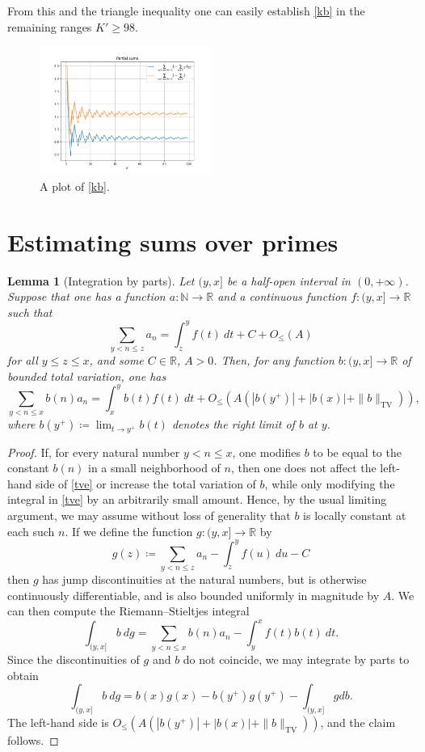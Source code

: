 \documentclass[12pt,a4paper,reqno]{amsart}
\numberwithin{equation}{section}
\theoremstyle{plain}
\newtheorem{lemma}[theorem]{Lemma}
\theoremstyle{definition}
\newcommand\R{\mathbb{R}}
\newcommand\N{\mathbb{N}}
\begin{document}
    From this and the triangle inequality one can easily establish \eqref{kb} in the remaining ranges $K' \geq 98$.
  
  \begin{figure}
  \centering
  \includegraphics[width=0.5\textwidth]{discrepancy.png}
  \caption{A plot of \eqref{kb}.}
  \label{fig:kb}
  \end{figure}

\section{Estimating sums over primes}

\begin{lemma}[Integration by parts]\label{integ-lemma}  Let $(y,x]$ be a half-open interval in $(0,+\infty)$.  Suppose that one has a function $a \colon \N \to \R$ and a continuous function $f: (y,x] \to \R$ such that 
  $$ \sum_{y < n \leq z} a_n = \int_z^y f(t)\ dt + C + O_{\leq}(A)$$
  for all $y \leq z \leq x$, and some $C \in \R$, $A>0$.  Then, for any function $b: (y,x] \to \R$ of bounded total variation, one has
\begin{equation}\label{tve}
   \sum_{y < n \leq x} b(n) a_n = \int_x^y b(t) f(t)\ dt + O_{\leq}(A (|b(y^+)| + |b(x)| + \|b\|_{\mathrm{TV}})),
\end{equation}
where $b(y^+) \coloneqq \lim_{t \to y^+} b(t)$ denotes the right limit of $b$ at $y$.
\end{lemma}

\begin{proof}  If, for every natural number $y < n \leq x$, one modifies $b$ to be equal to the constant $b(n)$ in a small neighborhood of $n$, then one does not affect the left-hand side of \eqref{tve} or increase the total variation of $b$, while only modifying the integral in \eqref{tve} by an arbitrarily small amount.  Hence, by the usual limiting argument, we may assume without loss of generality that $b$ is locally constant at each such $n$.  If we define the function $g \colon (y,x] \to \R$ by
$$ g(z) \coloneqq  \sum_{y < n \leq z} a_n - \int_z^y f(u)\ du - C$$
then $g$ has jump discontinuities at the natural numbers, but is otherwise continuously differentiable, and is also bounded uniformly in magnitude by $A$.  We can then compute the Riemann--Stieltjes integral
$$ \int_{(y,x]} b\ dg = \sum_{y < n \leq x} b(n) a_n - \int_y^x f(t) b(t)\ dt.$$
Since the discontinuities of $g$ and $b$ do not coincide, we may integrate by parts to obtain
$$ \int_{(y,x]} b\ dg = b(x) g(x) - b(y^+) g(y^+) - \int_{(y,x]} g db.$$
The left-hand side is $O_{\leq}(A (|b(y^+)| + |b(x)| + \|b\|_{\mathrm{TV}}))$, and the claim follows.
\end{proof}
\end{document}
